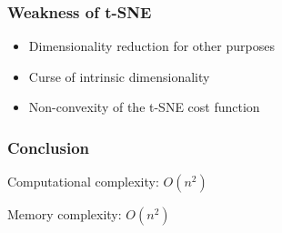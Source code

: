 \documentclass{beamer}
\begin{document}
% 
% 
% 
% 
% 
%
\begin{frame}
  \frametitle{Weakness of t-SNE}
  
  \begin{itemize}
    \item Dimensionality reduction for other purposes
    \item Curse of intrinsic dimensionality
    \item Non-convexity of the t-SNE cost function
  \end{itemize}
    
\end{frame}
% 
% 
% 
% 
% 
%
\begin{frame}
  \frametitle{Conclusion}

  Computational complexity: $O(n^2)$

  Memory complexity: $O(n^2)$
    
\end{frame}
\end{document}
